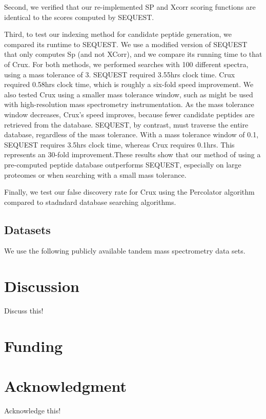 \documentclass{bioinfo}
\begin{document}
Second, we verified that our re-implemented SP and Xcorr scoring
functions are identical to the scores computed by SEQUEST.

Third, to test our indexing method for candidate peptide generation,
we compared its runtime to SEQUEST.  We use a modified version of
SEQUEST that only computes Sp (and not XCorr), and we compare its
running time to that of Crux.  For both methods, we performed searches
with 100 different spectra, using a mass tolerance of 3.  SEQUEST
required 3.55hrs clock time. Crux required 0.58hrs clock time, which
is roughly a six-fold speed improvement. We also tested Crux using a
smaller mass tolerance window, such as might be used with
high-resolution mass spectrometry instrumentation.  As the mass
tolerance window decreases, Crux's speed improves, because fewer
candidate peptides are retrieved from the database.  SEQUEST, by
contrast, must traverse the entire database, regardless of the mass
tolerance.  With a mass tolerance window of 0.1, SEQUEST requires
3.5hrs clock time, whereas Crux requires 0.1hrs.  This represents an
30-fold improvement.These results show that our method of using a
pre-computed peptide database outperforms SEQUEST, especially on large
proteomes or when searching with a small mass tolerance.

Finally, we test our false discovery rate for Crux using the
Percolator algorithm compared to stadndard database searching
algorithms.

\subsection*{Datasets}
We use the following publicly available tandem mass spectrometry data
sets.

\section{Discussion}
Discuss this!

\section*{Funding}

\section*{Acknowledgment}

Acknowledge this!





 
\end{document}
